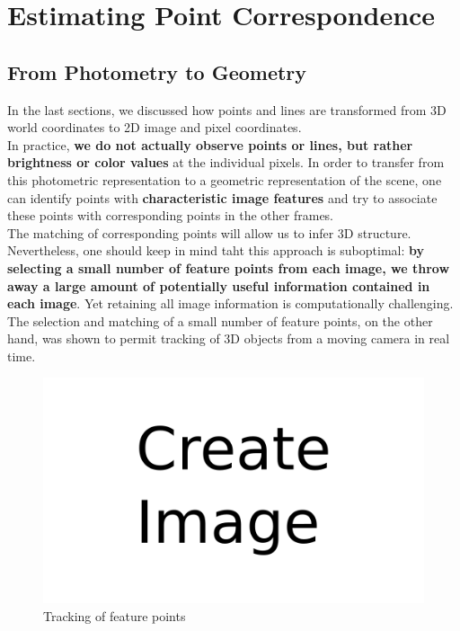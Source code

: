 \section{Estimating Point Correspondence}%
\label{sec:perspective_projection}


\subsection{From Photometry to Geometry}%
\label{sub:from_photometry_to_geometry}


In the last sections, we discussed how points and lines are transformed
from 3D world coordinates to 2D image and pixel coordinates.\\

In practice, \textbf{we do not actually observe points or lines,
but rather brightness or color values} at the individual pixels.
In order to transfer from this photometric representation to a
geometric representation of the scene, one can identify points with
\textbf{characteristic image features} and try to associate these
points with corresponding points in the other frames.\\

The matching of corresponding points will allow us to infer 3D structure.
Nevertheless, one should keep in mind taht this approach is suboptimal:
\textbf{by selecting a small number of feature points from each image,
we throw away a large amount of potentially useful information contained
in each image}.
Yet retaining all image information is computationally challenging.
The selection and matching of a small number of feature points,
on the other hand, was shown to permit tracking of 3D objects from
a moving camera in real time.

\begin{figure}[h]
	\centering
	\includegraphics[width=\linewidth]{img/todo.png}
	\caption{Tracking of feature points}%
	\label{fig:traking_feature}
\end{figure}

